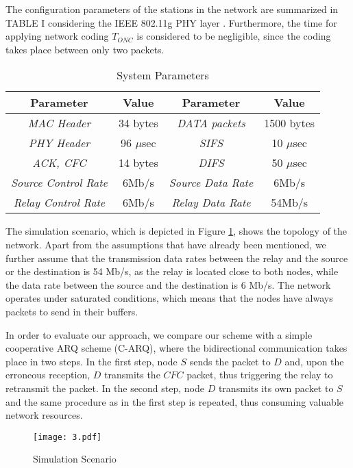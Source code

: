 \documentclass[conference]{IEEEtran}
\begin{document}
The configuration parameters of the stations in the network are summarized in TABLE I considering the IEEE 802.11g PHY layer \cite{IEEEhowto:80211g}. Furthermore, the time for applying network coding $T_{ONC}$ is considered to be negligible, since the coding takes place between only two packets.

\begin{table}[h]
\caption{System Parameters} \label{t1}
\begin{center}
\begin{tabular}{|c|c|c|c|}
\hline
\textbf{Parameter} & \textbf{Value} & \textbf{Parameter} & \textbf{Value} \\ \hline
\textit{MAC Header} & 34 bytes & \textit{DATA packets} & 1500 bytes \\ \hline
\textit{PHY Header} & 96 $\mu$sec & \textit{SIFS} & 10 $\mu$sec \\ \hline
\textit{ACK, CFC} & 14 bytes & \textit{DIFS} & 50 $\mu$sec \\ \hline
\textit{Source Control Rate} & 6Mb/s & \textit{Source Data Rate} & 6Mb/s \\ \hline
\textit{Relay Control Rate} & 6Mb/s & \textit{Relay Data Rate} & 54Mb/s \\ \hline
\end{tabular}
\end{center}
\end{table}

The simulation scenario, which is depicted in Figure \ref{f3}, shows the topology of the network. Apart from the assumptions that have already been mentioned, we further assume that the transmission data rates between the relay and the source or the destination is 54 Mb/s, as the relay is located close to both nodes, while the data rate between the source and the destination is 6 Mb/s. The network operates under saturated conditions, which means that the nodes have always packets to send in their buffers.

In order to evaluate our approach, we compare our scheme with a simple cooperative ARQ scheme (C-ARQ), where the bidirectional communication takes place in two steps. In the first step, node $S$ sends the packet to $D$ and, upon the erroneous reception, $D$ transmits the $CFC$ packet, thus triggering the relay to retransmit the packet. In the second step, node $D$ transmits its own packet to $S$ and the same procedure as in the first step is repeated, thus consuming valuable network resources.

\begin{figure}[htb]
\centering
\texttt{[image: 3.pdf]}
\caption{Simulation Scenario}\label{f3}
\end{figure}
\end{document}
